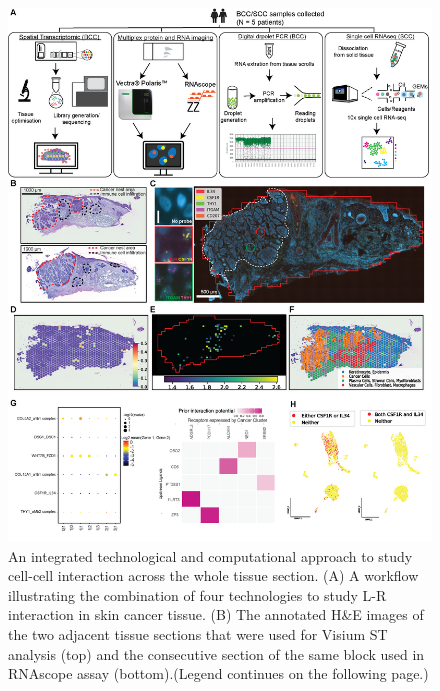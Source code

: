 \begin{figure}[htp]
    \centering
    \includegraphics[width=\columnwidth]{Chapter2/Figures/Chapter2_Fig1_techsum.png}
    \caption[An integrated technological and computational approach to study cell-cell interaction across the whole tissue section.]{ An integrated technological and computational approach to study cell-cell interaction across the whole tissue section. (A) A workflow illustrating the combination of four technologies to study L-R interaction in skin cancer tissue. (B) The annotated H\&E images of the two adjacent tissue sections that were used for Visium ST analysis (top) and the consecutive section of the same block used in RNAscope assay (bottom).(Legend continues on the following page.)}
    \label{fig:Chap2_figure1}
\end{figure}

